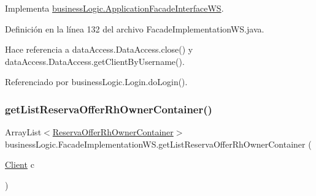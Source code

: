 Implementa \mbox{\hyperlink{interfacebusiness_logic_1_1_application_facade_interface_w_s_a0d69ed91aa71325dedc777f059999e93}{business\+Logic.\+Application\+Facade\+Interface\+WS}}.



Definición en la línea 132 del archivo Facade\+Implementation\+W\+S.\+java.


\begin{DoxyCode}{0}

\end{DoxyCode}


Hace referencia a data\+Access.\+Data\+Access.\+close() y data\+Access.\+Data\+Access.\+get\+Client\+By\+Username().



Referenciado por business\+Logic.\+Login.\+do\+Login().

\mbox{\label{classbusiness_logic_1_1_facade_implementation_w_s_a505c977d8d4ab62addb96006535d2912}} 
\subsubsection{\texorpdfstring{getListReservaOfferRhOwnerContainer()}{getListReservaOfferRhOwnerContainer()}}
{\footnotesize\ttfamily Array\+List$<$\mbox{\hyperlink{classdomain_1_1_reserva_offer_rh_owner_container}{Reserva\+Offer\+Rh\+Owner\+Container}}$>$ business\+Logic.\+Facade\+Implementation\+W\+S.\+get\+List\+Reserva\+Offer\+Rh\+Owner\+Container (\begin{DoxyParamCaption}\item[{\mbox{\hyperlink{classdomain_1_1_client}{Client}}}]{c }\end{DoxyParamCaption})}



